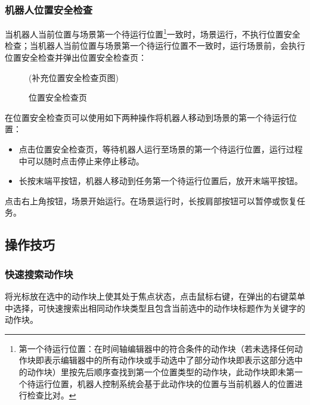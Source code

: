 
\subsubsection{机器人位置安全检查}
当机器人当前位置与场景第一个待运行位置\footnote{ 第一个待运行位置：在时间轴编辑器中的符合条件的动作块（若未选择任何动作块即表示编辑器中的所有动作块或手动选中了部分动作块即表示这部分选中的动作块）里按先后顺序查找到第一个位置类型的动作块，此动作块即未第一个待运行位置，机器人控制系统会基于此动作块的位置与当前机器人的位置进行检查比对。}一致时，场景运行，不执行位置安全检查；当机器人当前位置与场景第一个待运行位置不一致时，运行场景前，会执行位置安全检查并弹出位置安全检查页：

\begin{figure}[ht]
	\centering
	\color{red}(补充位置安全检查页图)
	\caption{位置安全检查页}
	\label{fig:位置安全检查页}
\end{figure}

在位置安全检查页可以使用如下两种操作将机器人移动到场景的第一个待运行位置：
\begin{itemize}
	\item 点击位置安全检查页，等待机器人运行至场景的第一个待运行位置，运行过程中可以随时点击停止来停止移动。
	\item 长按末端平按钮，机器人移动到任务第一个待运行位置后，放开末端平按钮。
\end{itemize}


点击右上角按钮，场景开始运行。在场景运行时，长按肩部按钮可以暂停或恢复任务。

\subsection{操作技巧}
\subsubsection{快速搜索动作块}
将光标放在选中的动作块上使其处于焦点状态，点击鼠标右键，在弹出的右键菜单中选择，可快速搜索出相同动作块类型且包含当前选中的动作块标题作为关键字的动作块。
